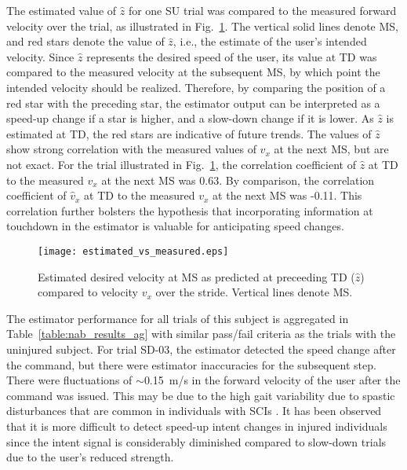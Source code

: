The estimated value of $ \hat{z} $ for one SU trial was compared to the measured forward velocity over the trial, as illustrated in Fig.~\ref{fig:m_v_e}. The vertical solid lines denote MS, and red stars denote the value of $ \hat{z} $, i.e., the estimate of the user's intended velocity. Since $\hat{z}$ represents the desired speed of the user, its value at TD was compared to the measured velocity at the subsequent MS, by which point the intended velocity should be realized. Therefore, by comparing the position of a red star with the preceding star, the estimator output can be interpreted as a speed-up change if a star is higher, and a slow-down change if it is lower. As $ \hat{z} $ is estimated at TD, the red stars are indicative of future trends. The values of $ \hat{z} $ show strong correlation with the measured values of $v_x$ at the next MS, but are not exact. For the trial illustrated in Fig.~\ref{fig:m_v_e}, the correlation coefficient of $ \hat{z} $ at TD to the measured $ v_x $ at the next MS was 0.63. By comparison, the correlation coefficient of $ \hat{v}_x $ at TD to the measured $ v_x $ at the next MS was -0.11. This correlation further bolsters the hypothesis that incorporating information at touchdown in the estimator is valuable for anticipating speed changes.

\begin{figure}
	\centering
	\texttt{[image: estimated\_vs\_measured.eps]}
	\caption{Estimated desired velocity at MS as predicted at preceeding TD ($\hat{z}$) compared to velocity $v_x$ over the stride. Vertical lines denote MS.} \label{fig:m_v_e}
\end{figure}

The estimator performance for all trials of this subject is aggregated in Table~\ref{table:nab_results_ag} with similar pass/fail criteria as the trials with the uninjured subject. For trial SD-03, the estimator detected the speed change after the command, but there were estimator inaccuracies for the subsequent step. There were fluctuations of $ \sim $0.15~m/s in the forward velocity of the user after the command was issued. This may be due to the high gait variability due to spastic disturbances that are common in individuals with SCIs \cite{malhotra2009spasticity}. It has been observed that it is more difficult to detect speed-up intent changes in injured individuals since the intent signal is considerably diminished compared to slow-down trials \cite{gambon2020effects} due to the user's reduced strength.

